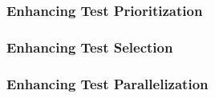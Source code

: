 \subsubsection{Enhancing Test Prioritization}

\subsubsection{Enhancing Test Selection}

\subsubsection{Enhancing Test Parallelization}
